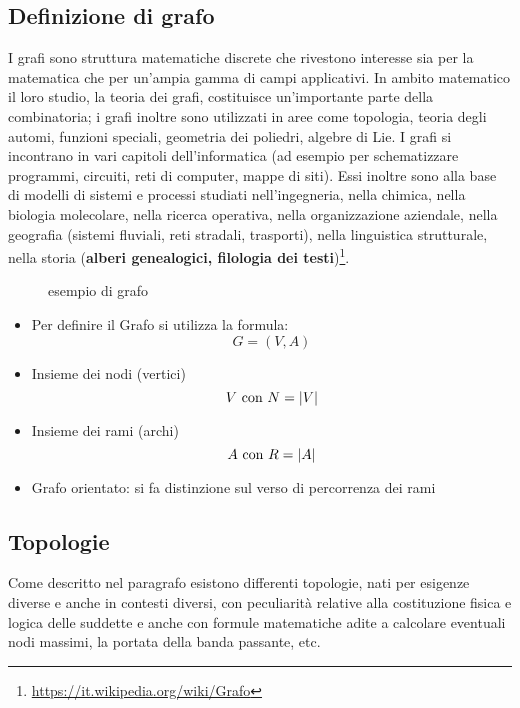 \subsection{Definizione di grafo}
\begin{defi}
  I grafi sono struttura matematiche discrete che rivestono interesse sia per la
  matematica che per un'ampia gamma di campi applicativi. In ambito matematico il loro
  studio, la teoria dei grafi, costituisce un'importante parte della combinatoria; i
  grafi inoltre sono utilizzati in aree come topologia, teoria degli automi, funzioni
  speciali, geometria dei poliedri, algebre di Lie. I grafi si incontrano in vari
  capitoli dell'informatica (ad esempio per schematizzare programmi, circuiti, reti di
  computer, mappe di siti). Essi inoltre sono alla base di modelli di sistemi e
  processi studiati nell'ingegneria, nella chimica, nella biologia molecolare, nella
  ricerca operativa, nella organizzazione aziendale, nella geografia (sistemi fluviali,
  reti stradali, trasporti), nella linguistica strutturale, nella storia
  ({\bf alberi genealogici, filologia dei testi})\footnote{\href{https://it.wikipedia.org/wiki/Grafo}{https://it.wikipedia.org/wiki/Grafo}}. 
\end{defi}
\label{sec:grafo}
\begin{figure}[ht]
  \centering
  
  \caption{esempio di grafo}
  \label{fig:grafolesempio}
\end{figure}
\begin{itemize}
\item Per definire il Grafo si utilizza la formula:
  \begin{equation}
    \label{eq:grafodef}
    G=(V,A)
  \end{equation}
\item Insieme dei nodi (vertici)
  \begin{equation}
    \label{eq:insiemedeinodi}
    V\text{ con } N=\lvert V\rvert
  \end{equation}
\item Insieme dei rami (archi)
  \begin{equation}
    \label{eq:insiemedeirami}
    A\text{ con } R=\lvert A\rvert
  \end{equation}
\item Grafo orientato: si fa distinzione sul verso di percorrenza dei rami
\end{itemize}
\subsection{Topologie}
\label{sec:top}
Come descritto nel paragrafo esistono differenti topologie, nati per esigenze diverse e
anche in contesti diversi, con peculiarità relative alla costituzione fisica e logica
delle suddette e anche con formule matematiche adite a calcolare eventuali nodi massimi,
la portata della banda passante, etc.  


